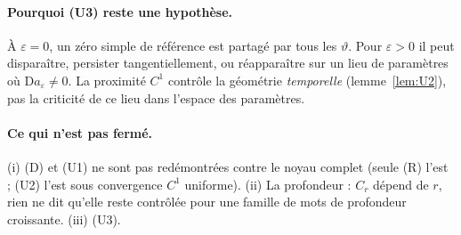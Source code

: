 \documentclass[11pt,a4paper]{article}
\theoremstyle{remark}
\newcommand{\vth}{\vartheta}
\newcommand{\D}{\mathrm D}
\begin{document}
\paragraph{Pourquoi (U3) reste une hypothèse.} À $\varepsilon=0$, un zéro simple de référence est partagé par tous les $\vth$. Pour $\varepsilon>0$ il peut disparaître, persister tangentiellement, ou réapparaître sur un lieu de paramètres où $\D a_\varepsilon\ne0$. La proximité $C^1$ contrôle la géométrie \emph{temporelle} (lemme~\ref{lem:U2}), pas la criticité de ce lieu dans l'espace des paramètres.

\paragraph{Ce qui n'est pas fermé.} (i) (D) et (U1) ne sont pas redémontrées contre le noyau complet (seule (R) l'est ; (U2) l'est sous convergence $C^1$ uniforme). (ii) La profondeur : $C_r$ dépend de $r$, rien ne dit qu'elle reste contrôlée pour une famille de mots de profondeur croissante. (iii) (U3).
\end{document}

